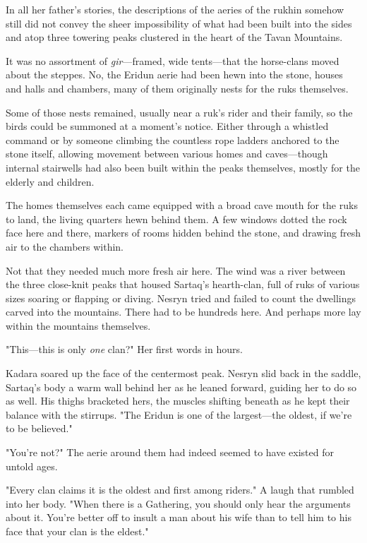 In all her father's stories, the descriptions of the aeries of the rukhin somehow still did not convey the sheer impossibility of what had been built into the sides and atop three towering peaks clustered in the heart of the Tavan Mountains.

It was no assortment of \emph{gir}---framed, wide tents---that the horse-clans moved about the steppes. No, the Eridun aerie had been hewn into the stone, houses and halls and chambers, many of them originally nests for the ruks themselves.

Some of those nests remained, usually near a ruk's rider and their family, so the birds could be summoned at a moment's notice. Either through a whistled command or by someone climbing the countless rope ladders anchored to the stone itself, allowing movement between various homes and caves---though internal stairwells had also been built within the peaks themselves, mostly for the elderly and children.

The homes themselves each came equipped with a broad cave mouth for the ruks to land, the living quarters hewn behind them. A few windows dotted the rock face here and there, markers of rooms hidden behind the stone, and drawing fresh air to the chambers within.

Not that they needed much more fresh air here. The wind was a river between the three close-knit peaks that housed Sartaq's hearth-clan, full of ruks of various sizes soaring or flapping or diving. Nesryn tried and failed to count the dwellings carved into the mountains. There had to be hundreds here. And perhaps more lay within the mountains themselves.

"This---this is only \emph{one} clan?" Her first words in hours.

Kadara soared up the face of the centermost peak. Nesryn slid back in the saddle, Sartaq's body a warm wall behind her as he leaned forward, guiding her to do so as well. His thighs bracketed hers, the muscles shifting beneath as he kept their balance with the stirrups. "The Eridun is one of the largest---the oldest, if we're to be believed."

"You're not?" The aerie around them had indeed seemed to have existed for untold ages.

"Every clan claims it is the oldest and first among riders." A laugh that rumbled into her body. "When there is a Gathering, you should only hear the arguments about it. You're better off to insult a man about his wife than to tell him to his face that your clan is the eldest."

